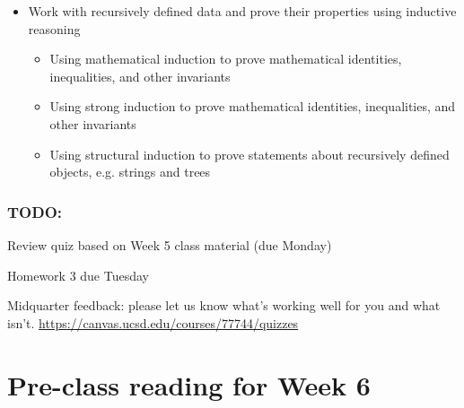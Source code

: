 \begin{itemize}
\item Work with recursively defined data and prove their properties using inductive reasoning
\begin{itemize}
\item Using mathematical induction to prove mathematical identities, inequalities, and other invariants
\item Using strong induction to prove mathematical identities, inequalities, and other invariants
\item Using structural induction to prove statements about recursively defined objects, e.g. strings and trees
\end{itemize}
\end{itemize}

\subsubsection*{TODO:}
\begin{list}
   {\itemsep2pt}
    \item Review quiz based on Week 5 class material (due Monday)
    \item Homework 3 due Tuesday
    \item Midquarter feedback: please let us know what's working well for you and what isn't.  \url{https://canvas.ucsd.edu/courses/77744/quizzes}
\end{list}

\newpage


\section*{Pre-class reading for Week 6}

